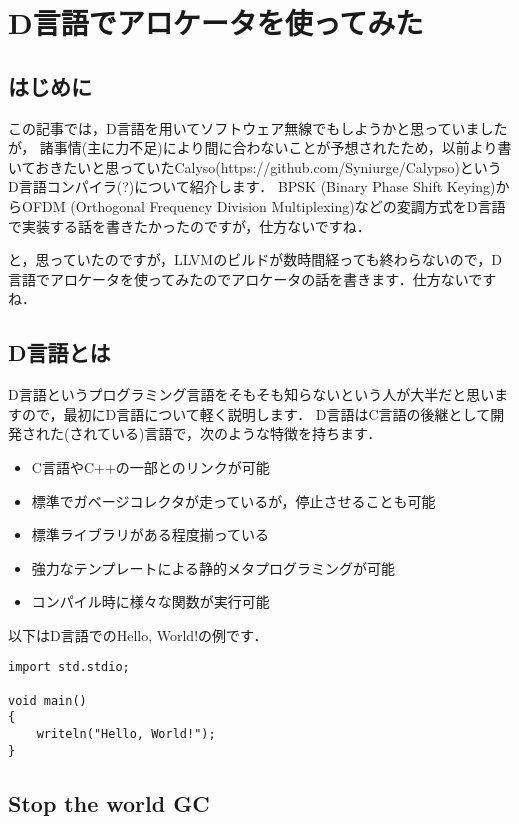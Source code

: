 \chapter{D言語でアロケータを使ってみた}

\section{はじめに}

この記事では，D言語を用いてソフトウェア無線でもしようかと思っていましたが，
諸事情(主に力不足)により間に合わないことが予想されたため，以前より書いておきたいと思っていたCalyso(https://github.com/Syniurge/Calypso)というD言語コンパイラ(?)について紹介します．
BPSK (Binary Phase Shift Keying)からOFDM (Orthogonal Frequency Division Multiplexing)などの変調方式をD言語で実装する話を書きたかったのですが，仕方ないですね．

と，思っていたのですが，LLVMのビルドが数時間経っても終わらないので，D言語でアロケータを使ってみたのでアロケータの話を書きます．仕方ないですね．



\section{D言語とは}

D言語というプログラミング言語をそもそも知らないという人が大半だと思いますので，最初にD言語について軽く説明します．
D言語はC言語の後継として開発された(されている)言語で，次のような特徴を持ちます．

\begin{itemize}
\item C言語やC++の一部とのリンクが可能
\item 標準でガベージコレクタが走っているが，停止させることも可能
\item 標準ライブラリがある程度揃っている
\item 強力なテンプレートによる静的メタプログラミングが可能
\item コンパイル時に様々な関数が実行可能
\end{itemize}

以下はD言語でのHello, World!の例です．

\begin{lstlisting}[]
import std.stdio;

void main()
{
    writeln("Hello, World!");
}
\end{lstlisting}


\section{Stop the world GC}

